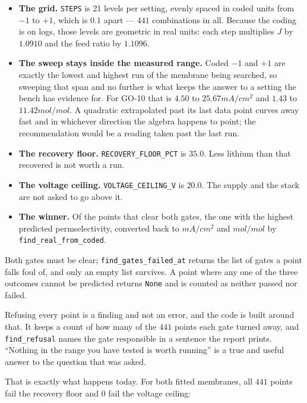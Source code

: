 \begin{itemize}[nosep]
  \item \textbf{The grid.} \texttt{STEPS} is 21 levels per setting, evenly spaced in coded units
        from $-1$ to $+1$, which is $0.1$ apart --- $441$ combinations in all. Because the coding
        is on logs, those levels are geometric in real units: each step multiplies $J$ by
        $1.0910$ and the feed ratio by $1.1096$.
  \item \textbf{The sweep stays inside the measured range.} Coded $-1$ and $+1$ are exactly the
        lowest and highest run of the membrane being searched, so sweeping that span and no
        further is what keeps the answer to a setting the bench has evidence for. For GO-10 that
        is $4.50$ to $25.67\unit{mA/cm^2}$ and $1.43$ to $11.42\unit{mol/mol}$. A quadratic
        extrapolated past its last data point curves away fast and in whichever direction the
        algebra happens to point; the recommendation would be a reading taken past the last run.
  \item \textbf{The recovery floor.} \texttt{RECOVERY\_FLOOR\_PCT} is $35.0$. Less lithium than
        that recovered is not worth a run.
  \item \textbf{The voltage ceiling.} \texttt{VOLTAGE\_CEILING\_V} is $20.0$. The supply and the
        stack are not asked to go above it.
  \item \textbf{The winner.} Of the points that clear both gates, the one with the highest
        predicted permselectivity, converted back to $\unit{mA/cm^2}$ and $\unit{mol/mol}$ by
        \texttt{find\_real\_from\_coded}.
\end{itemize}

Both gates must be clear; \texttt{find\_gates\_failed\_at} returns the list of gates a point
falls foul of, and only an empty list survives. A point where any one of the three outcomes
cannot be predicted returns \texttt{None} and is counted as neither passed nor failed.

Refusing every point is a finding and not an error, and the code is built around that. It keeps a
count of how many of the $441$ points each gate turned away, and \texttt{find\_refusal} names the
gate responsible in a sentence the report prints. ``Nothing in the range you have tested is worth
running'' is a true and useful answer to the question that was asked.

That is exactly what happens today. For both fitted membranes, all $441$ points fail the recovery
floor and $0$ fail the voltage ceiling:

